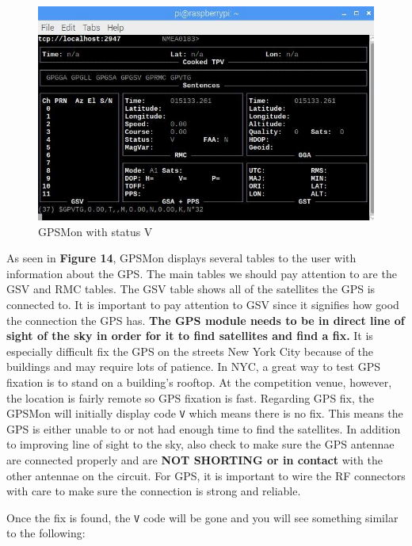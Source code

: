 \documentclass[12pt, letterpaper]{article}
\begin{document}
{{\begin{figure}[h!]
	\centering
	\includegraphics[width=1\columnwidth]{assets/jmtzc121ckdwez9lyvxft8sxqyas1dja.jpg}
	\caption{GPSMon with status V}
	\end{figure}	

\newpage
	As seen in \textbf{Figure 14}, GPSMon displays several tables to the user with information about the GPS. The main tables we should pay attention to are the GSV and RMC tables. The GSV table shows all of the satellites the GPS is connected to. It is important to pay attention to GSV since it signifies how good the connection the GPS has. \textbf{The GPS module needs to be in direct line of sight of the sky in order for it to find satellites and find a fix.} It is especially difficult fix the GPS on the streets New York City because of the buildings and may require lots of patience. In NYC, a great way to test GPS fixation is to stand on a building's rooftop. At the competition venue, however, the location is fairly remote so GPS fixation is fast. Regarding GPS fix, the GPSMon will initially display code \texttt{V} which means there is no fix. This means the GPS is either unable to or not had enough time to find the satellites. In addition to improving line of sight to the sky, also check to make sure the GPS antennae are connected properly and are \textbf{NOT SHORTING or in contact} with the other antennae on the circuit. For GPS, it is important to wire the RF connectors with care to make sure the connection is strong and reliable. 
	\par Once the fix is found, the \texttt{V} code will be gone and you will see something similar to the following:

}}
\end{document}
